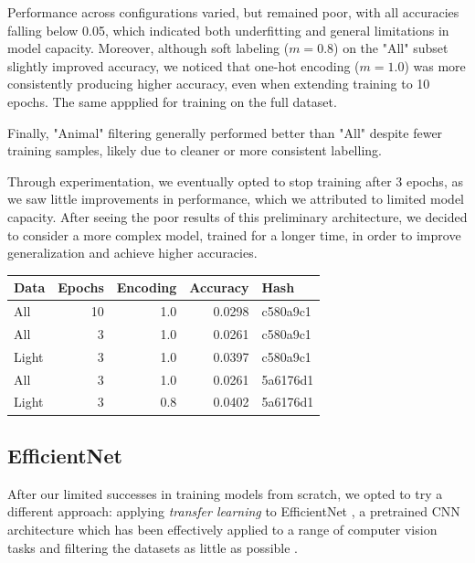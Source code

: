 \documentclass[11pt]{article}
\begin{document}
Performance across configurations varied, but remained poor, with all accuracies falling below 0.05, which indicated both underfitting and general limitations in model capacity. Moreover, although soft labeling ($m=0.8$) on the "All" subset slightly improved accuracy, we noticed that one-hot encoding ($m=1.0$) was more consistently producing higher accuracy, even when extending training to 10 epochs. The same appplied for training on the full dataset.

Finally, "Animal" filtering generally performed better than "All" despite fewer training samples, likely due to cleaner or more consistent labelling.

\begin{minipage}{0.48\linewidth}
  Through experimentation, we eventually opted to stop training after 3 epochs, as we saw little improvements in performance, which we attributed to limited model capacity. After seeing the poor results of this preliminary architecture, we decided to consider a more complex model, trained for a longer time, in order to improve generalization and achieve higher accuracies.
\end{minipage}
\hfill
\begin{minipage}{0.48\linewidth}
  \centering
  \begin{tabular}{|l|r|r|r|l|}
    \hline
    Data  & Epochs & Encoding & Accuracy & Hash     \\
    \hline
    All    & 10     & 1.0      & 0.0298   & c580a9c1 \\
    All    & 3      & 1.0      & 0.0261   & c580a9c1 \\
    Light  & 3      & 1.0      & 0.0397   & c580a9c1 \\
    All    & 3      & 1.0      & 0.0261   & 5a6176d1 \\
    Light  & 3      & 0.8      & 0.0402   & 5a6176d1 \\
    \hline
  \end{tabular}
\end{minipage}
\subsection*{EfficientNet}

After our limited successes in training models from scratch, we opted to try a different approach: applying \emph{transfer learning} to EfficientNet \cite{efficientnet}, a pretrained CNN architecture which has been effectively applied to a range of computer vision tasks and filtering the datasets as little as possible .
\end{document}
